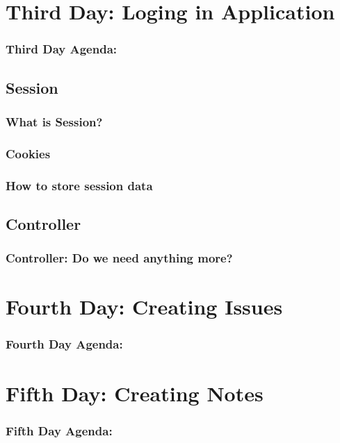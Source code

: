 \documentclass{beamer}
\begin{document}
\section{Third Day: Loging in Application}
    \begin{frame}
      \frametitle{Third Day Agenda:}
      \tableofcontents
      [
      currentsection,
      sectionstyle=hide/hide,
      subsectionstyle=show/show/hide
      ]
    \end{frame}
  \subsection{Session}
    \begin{frame}
      \frametitle{What is Session?}
    \end{frame}
    \subsubsection{Cookies}
      \begin{frame}
        \frametitle{How to store session data}
      \end{frame}
      \subsection{Controller}
      \begin{frame}
        \frametitle{Controller: Do we need anything more?}
      \end{frame}
 

\section{Fourth Day: Creating Issues}
    \begin{frame}
      \frametitle{Fourth Day Agenda:}
      \tableofcontents
      [
      currentsection,
      sectionstyle=hide/hide,
      subsectionstyle=show/show/hide
      ]
    \end{frame}

\section{Fifth Day: Creating Notes}
    \begin{frame}
      \frametitle{Fifth Day Agenda:}
      \tableofcontents
      [
      currentsection,
      sectionstyle=hide/hide,
      subsectionstyle=show/show/hide
      ]
    \end{frame}
  
\end{document}
